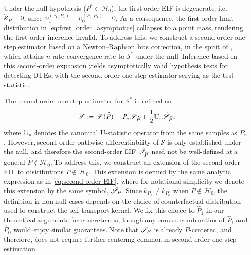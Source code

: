 \documentclass{article}
\theoremstyle{plain}
\theoremstyle{definition}
\theoremstyle{remark}
\newcommand{\U}{\mathbb{U}}
\newcommand{\cP}{\mathcal{P}}
\newcommand{\ucH}{\mathscr{H}}
\newcommand{\hP}{\widehat{P}}
\newcommand{\1}{\mathbbm{1}}
\newcommand{\STE}{\mathscr{S}}
\theoremstyle{plain}
\theoremstyle{definition}
\begin{document}
Under the null hypothesis ($P^* \in \ucH_0$), the first-order EIF is degenerate, i.e. $\dot{\STE}_P = 0$, since $\upsilon_1^{(P_1, P_1)} = \upsilon_0^{(P_1, P_1)} = 0$. As a consequence, the first-order limit distribution in \eqref{eq:first_order_asymptotics} collapses to a point mass, rendering the first-order inference invalid. To address this, we construct a second-order one-step estimator based on a Newton–Raphson bias correction, in the spirit of \citet{robins2008higher}, which attains $n$-rate convergence rate to $\STE^*$ under the null. Inference based on this second-order expansion yields asymptotically valid hypothesis tests for detecting DTEs, with the second-order one-step estimator serving as the test statistic. 

The second-order one-step estimator for $\STE^*$ is defined as
\begin{equation}\label{eq:second_order_one_step}
    \overline{\STE} := \STE(\hP) + P_n \dot{\STE}_{\hP} + \frac{1}{2} \U_n \Ddot{\STE}_{\hP},
\end{equation}
where $\U_n$ denotes the canonical U-statistic operator from the same samples as $P_n$. However, second-order pathwise differentiability of $\STE$ is only established under the null, and therefore the second-order EIF $\Ddot{\STE}_{\hP}$ need not be well-defined at a general $\hP \notin \ucH_0$. To address this, we construct an extension of the second-order EIF to distributions $P \notin \ucH_0$. This extension is defined by the same analytic expression as in \eqref{eq:second-order-EIF}, where for notational simplicity we denote this extension by the same symbol, $\Ddot{\STE}_P$. Since $k_{P_1} \neq k_{P_0}$ when $P \notin \ucH_0$, the definition in non-null cases depends on the choice of counterfactual distribution used to construct the self-transport kernel. We fix this choice to $\hP_1$ in our theoretical arguments for concreteness, though any convex combination of $\hP_1$ and $\hP_0$ would enjoy similar guarantees. %
Note that $\Ddot{\STE}_P$ is already $P$-centered, and therefore, does not require further centering common in second-order one-step estimation \citep{luedtke2019omnibus}. %
\end{document}
